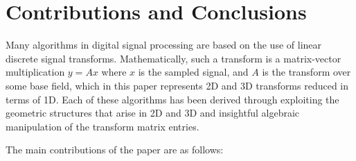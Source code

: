 \documentclass{UCF_ETD}
\begin{document}
 
 \section{Contributions and Conclusions} \label{Section_Conclusions}
  
 Many algorithms in digital signal processing are based on the use of linear discrete signal transforms. Mathematically, such a transform is a matrix-vector multiplication $y= A x$ where $x$ is the sampled signal, and $A$ is the transform over some base field, which in this paper represents 2D and 3D transforms reduced in terms of 1D.
 Each of these algorithms has been derived through exploiting the geometric structures that arise in 2D and 3D and insightful algebraic manipulation of the transform matrix entries.
 
 The main contributions of the paper are as follows:
 
\end{document}
